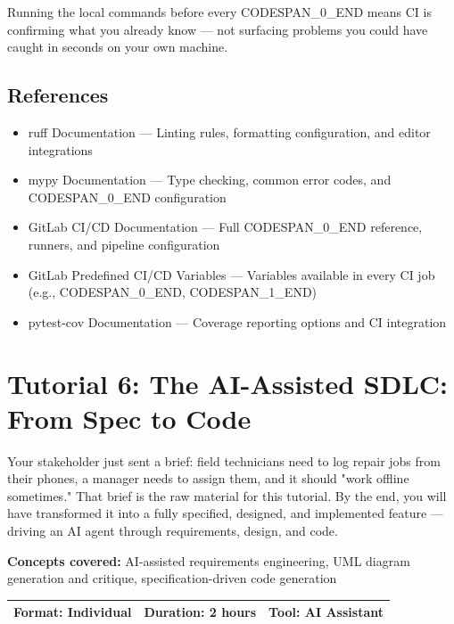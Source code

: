 \documentclass[11pt,a4paper]{book}
\begin{document}
Running the local commands before every CODESPAN\_0\_END means CI is confirming what you already know --- not surfacing problems you could have caught in seconds on your own machine.

\medskip

\section{References}

\begin{itemize}
  \item ruff Documentation --- Linting rules, formatting configuration, and editor integrations
  \item mypy Documentation --- Type checking, common error codes, and CODESPAN\_0\_END configuration
  \item GitLab CI/CD Documentation --- Full CODESPAN\_0\_END reference, runners, and pipeline configuration
  \item GitLab Predefined CI/CD Variables --- Variables available in every CI job (e.g., CODESPAN\_0\_END, CODESPAN\_1\_END)
  \item pytest-cov Documentation --- Coverage reporting options and CI integration
\end{itemize}


\chapter{Tutorial 6: The AI-Assisted SDLC: From Spec to Code}

Your stakeholder just sent a brief: field technicians need to log repair jobs from their phones, a manager needs to assign them, and it should "work offline sometimes." That brief is the raw material for this tutorial. By the end, you will have transformed it into a fully specified, designed, and implemented feature --- driving an AI agent through requirements, design, and code.

\textbf{Concepts covered:} AI-assisted requirements engineering, UML diagram generation and critique, specification-driven code generation

\begin{tabular}{lll}
\hline
\textbf{Format:} Individual & \textbf{Duration:} 2 hours & \textbf{Tool:} AI Assistant \\
\hline
\end{tabular}

\medskip
\end{document}
